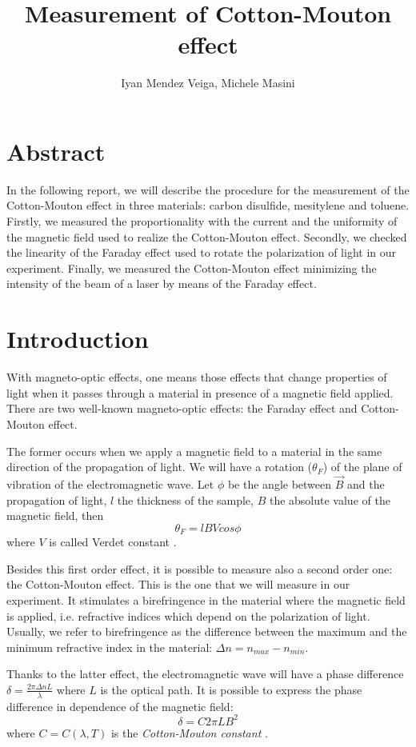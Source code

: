 \documentclass[•]{article}
\title{Measurement of Cotton-Mouton effect}
\author{Iyan Mendez Veiga, Michele Masini}
\begin{document}
\maketitle
	\section*{Abstract}
	In the following report, we will describe the procedure for the measurement of the Cotton-Mouton effect in three materials: carbon disulfide, mesitylene and toluene. Firstly, we measured the proportionality with the current and the uniformity of the magnetic field used to realize the Cotton-Mouton effect. Secondly, we checked the linearity of the Faraday effect used to rotate the polarization of light in our experiment. Finally, we measured the Cotton-Mouton effect minimizing the intensity of the beam of a laser by means of the Faraday effect.
	\section{Introduction}
	With magneto-optic effects, one means those effects that change properties of light when it passes through a material in presence of a magnetic field applied.	There are two well-known magneto-optic effects: the Faraday effect and Cotton-Mouton effect.
	
	The former occurs when we apply a magnetic field to a material in the same direction of the propagation of light. We will have a rotation ($\theta_F$) of the plane of vibration of the electromagnetic wave. Let $\phi$ be the angle between $\vec{B}$ and the propagation of light, $l$ the thickness of the sample, $B$ the absolute value of the magnetic field, then
	\begin{equation}
	\theta_F=lBVcos\phi
\end{equation}	 where $V$ is called Verdet constant \cite{cappelli2003cotton}. 

Besides this first order effect, it is possible to measure also a second order one: the Cotton-Mouton effect. This is the one that we will measure in our experiment. It stimulates a birefringence in the material where the magnetic field is applied, i.e. refractive indices which depend on the polarization of light. Usually, we refer to birefringence as the difference between the maximum and the minimum refractive index in the material: $\Delta n=n_{max}-n_{min}$.

Thanks to the latter effect, the electromagnetic wave will have a phase difference $\delta=\frac{2\pi \Delta n L}{\lambda}$ where $L$ is the optical path. It is possible to express the phase difference in dependence of the magnetic field:
\begin{equation}
\delta=C2\pi L B^2
\end{equation}
where $C=C(\lambda,T)$ is the \emph{Cotton-Mouton constant} \cite{wilson1997simple}.
	
\end{document}
